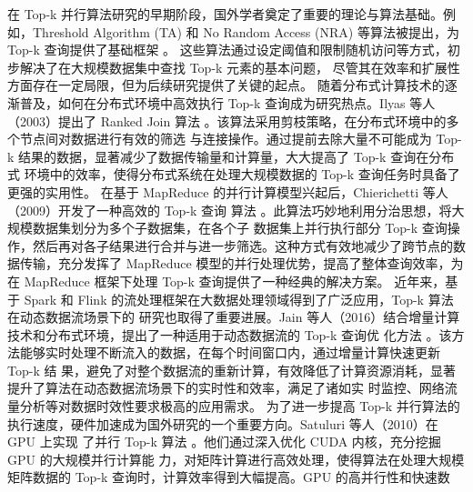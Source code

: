 
在 Top-k 并行算法研究的早期阶段，国外学者奠定了重要的理论与算法基础。例如，Threshold Algorithm (TA) 和 No Random Access 
(NRA) 等算法被提出，为 Top-k 查询提供了基础框架 \cite {fagin2001}。
这些算法通过设定阈值和限制随机访问等方式，初步解决了在大规模数据集中查找 Top-k 元素的基本问题，
尽管其在效率和扩展性方面存在一定局限，但为后续研究提供了关键的起点。
随着分布式计算技术的逐渐普及，如何在分布式环境中高效执行 Top-k 查询成为研究热点。Ilyas 等人（2003）提出了
 Ranked Join 算法 \cite {ilyas2003}。该算法采用剪枝策略，在分布式环境中的多个节点间对数据进行有效的筛选
 与连接操作。通过提前去除大量不可能成为 Top-k 结果的数据，显著减少了数据传输量和计算量，大大提高了 Top-k 查询在分布式
 环境中的效率，使得分布式系统在处理大规模数据的 Top-k 查询任务时具备了更强的实用性。
在基于 MapReduce 的并行计算模型兴起后，Chierichetti 等人（2009）开发了一种高效的 Top-k 查询
算法 \cite {chierichetti2009}。此算法巧妙地利用分治思想，将大规模数据集划分为多个子数据集，在各个子
数据集上并行执行部分 Top-k 查询操作，然后再对各子结果进行合并与进一步筛选。这种方式有效地减少了跨节点的数据传输，充分发挥了 MapReduce 模型的并行处理优势，提高了整体查询效率，为在 MapReduce 框架下处理 Top-k 查询提供了一种经典的解决方案。
近年来，基于 Spark 和 Flink 的流处理框架在大数据处理领域得到了广泛应用，Top-k 算法在动态数据流场景下的
研究也取得了重要进展。Jain 等人（2016）结合增量计算技术和分布式环境，提出了一种适用于动态数据流的 Top-k 查询优
化方法 \cite {jain2016}。该方法能够实时处理不断流入的数据，在每个时间窗口内，通过增量计算快速更新 Top-k 结
果，避免了对整个数据流的重新计算，有效降低了计算资源消耗，显著提升了算法在动态数据流场景下的实时性和效率，满足了诸如实
时监控、网络流量分析等对数据时效性要求极高的应用需求。
为了进一步提高 Top-k 并行算法的执行速度，硬件加速成为国外研究的一个重要方向。Satuluri 等人（2010）在 GPU 上实现
了并行 Top-k 算法 \cite {satuluri2010}。他们通过深入优化 CUDA 内核，充分挖掘 GPU 的大规模并行计算能
力，对矩阵计算进行高效处理，使得算法在处理大规模矩阵数据的 Top-k 查询时，计算效率得到大幅提高。GPU 的高并行性和快速数
